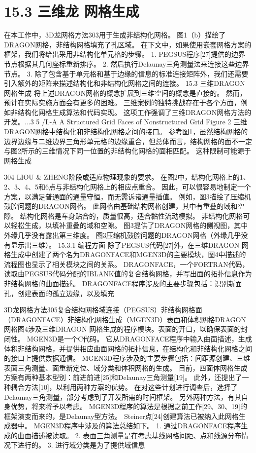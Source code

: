 \documentclass[UTF8,11pt,a4paper,openany,fontset=fandol]{ctexbook}
\begin{document}
\section{15.3 三维龙 网格生成}
在本工作中，3D龙网格方法303用于生成非结构化网格。 图1（b）描绘了DRAGON网格，非结构网格填充了孔区域。 在下文中，如果使用嵌套网格方案的框架，我们将给出采用非结构化单元格的步骤。 1. PEGSUS程序[27]提供的边界节点根据其几何座标重新排序。 2. 然后执行Delaunay三角测量法来连接这些边界节点。 3. 除了包含基于单元格和基于边缘的信息的标准连接矩阵外，我们还需要引入额外的矩阵来描述结构化和非结构化网格之间的连接。 15.3 三维DRAGON 网格生成 将上述DRAGON网格的概念扩展到三维空间的概念是直接的。 然而，预计在实际实施方面会有更多的困难。 三维案例的独特挑战存在于各个方面，例如非结构化网格生成算法和代码实现。 这项工作强调了三维DRAGON网格方法的开发。...3 5 /L-A A Structured Grid Faces of Nonstructured Grid Figure 2 三维DRAGON网格中结构化和非结构化网格之间的接口。 参考图1，虽然结构网格的边界边缘与二维边界三角形单元格的边缘重合，但总体而言，结构网格的面不一定与图2所示的三维情况下同一位置的非结构化网格的面相匹配。 这种限制可能源于网格生成

304 LIOU \& ZHENG阶段或适应物理现象的要求。 在图2中，结构化网格上的1、2、3、4、5和6点与非结构化网格上的相应点重合。 因此，可以很容易地制定一个方案，以满足普通面的通量守恒，而无需诉诸通量插值。 例如，图3描绘了压缩机鼓腔问题的DRAGON网格。 此网格由基础结构网格创建，其中有重叠的域和空隙。 结构化网格是车身贴合的，质量很高，适合黏性流动模拟。 非结构化网格可以轻松生成，以填补重叠的域和空隙。 图3提供了DRAGON网格的侧视图，其中外缘几乎没有露出第三维度。 图3压缩机鼓腔问题的DRAGON网格（外缘几乎没有显示出三维）。 15.3.1 编程方面 除了PEGSUS代码[27]外，在三维DRAGON 网格生成中创建了两个名为DRAGONFACE和MGEN3D的主要模块，图4中描述的流程图也显示了相关模块之间的关系。 DRAGONFACE，一个FORTRAN代码，读取由PEGSUS代码分配的IBLANK值的复合结构网格，并写出面的拓扑信息作为非结构网格的曲面描述。 DRAGONFACE程序涉及的主要步骤包括：识别新面孔，创建表面的孤立边缘，以及填充

3D龙网格方法305复合结构网格域连接（PEGSUS）非结构网格面（DRAGONFACE）非结构化网格生成（MGEN3D）表面和体积网格DRAGON网格图4涉及三维DRAGON 网格生成的程序模块。表面的开口，以确保表面的封闭性。 MGEN3D是一个C代码。 它从DRAGONFACE程序中输入曲面描述，生成体积非结构网格，并提供相应曲面网格的拓扑信息，在结构化和非结构化网格之间的接口上提供数据通信。 MGEN3D程序涉及的主要步骤包括：间距源创建、三维表面三角测量、面重新定位、域分类和体积网格的生成。 目前，四面体网格生成方案有两种基本型别：前进前进[25]和Delaunay三角测量[19]。 此外，还提出了一种耦合方法[10]，以利用两种方案的优势。 在对这些计划进行调查后，选择了Delaunay三角测量，部分考虑到了开发所需的时间框架。 另外两种方法，有其自身优势，将来将予以考虑。 MGEN3D程序的算法是根据之前工作[29、30、19]的框架演变而来的，是Delaunay型方法。 Steiner点[24]创建算法已被纳入此网格生成器中。 MGEN3D程序中涉及的算法总结如下。 1. 通过DRAGONFACE程序生成的曲面描述被读取。 2. 表面三角测量是在考虑基线网格间距、点和线源分布情况下进行的。 3. 进行域分类是为了提供域信息
\end{document}

